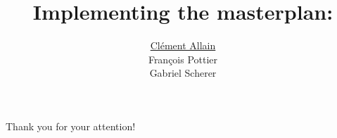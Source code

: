 \documentclass[aspectratio=169, xcolor=dvipsnames]{beamer}
\title{
  Implementing the \raisebox{-0.2cm}{\texttt{[image: images/iris.png]}} masterplan: \OCaml
}
\author{
  \underline{Clément Allain} \\
  François Pottier \\
  Gabriel Scherer
}
\begin{document}

\begin{frame}
\titlepage
\end{frame}










\begin{frame}
\centering
\huge
Thank you for your attention!
\end{frame}

\end{document}
